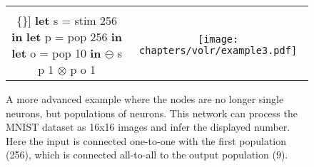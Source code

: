 \begin{figure}
  \ContinuedFloat
  \begin{tabular}[t]{c c}
    \begin{minipage}{0.4\textwidth}
      \begin{Verbatim}[mathescape,commandchars=\\\{\}]
\textbf{let} s = stim 256 \textbf{in}
  \textbf{let} p = pop 256 \textbf{in}
    \textbf{let} o = pop 10 \textbf{in}
      $\ominus$ s p 1
      $\otimes$ p o 1
      \end{Verbatim}
    \end{minipage} & \begin{minipage}{0.6\textwidth}
      \texttt{[image: chapters/volr/example3.pdf]}
    \end{minipage}
  \end{tabular}
  \caption{A more advanced example where the nodes are no longer single
    neurons, but populations of neurons. 
    This network can process the MNIST dataset as 16x16 images and
    infer the displayed number. Here the input is connected one-to-one
    with the first population (256), which is connected all-to-all to the 
    output population (9).}
  \label{fig:volr-example2}
\end{figure}